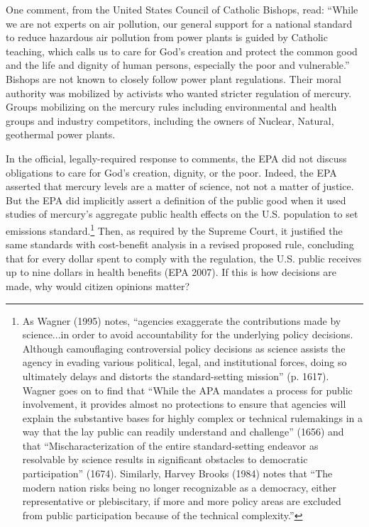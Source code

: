 One comment, from the United States Council of Catholic Bishops, read: ``While we are not experts on air pollution, our general support for a national standard to reduce hazardous air pollution from power plants is guided by Catholic teaching, which calls us to care for God’s creation and protect the common good and the life and dignity of human persons, especially the poor and vulnerable.'' Bishops are not known to closely follow power plant regulations. Their moral authority was mobilized by activists who wanted stricter regulation of mercury. Groups mobilizing on the mercury rules including environmental and health groups and industry competitors, including the owners of Nuclear, Natural, geothermal power plants. 

In the official, legally-required response to comments, the EPA did not discuss obligations to care for God's creation, dignity, or the poor. Indeed, the EPA asserted that mercury levels are a matter of science, not not a matter of justice. But the EPA did implicitly assert a definition of the public good when it used studies of mercury's aggregate public health effects on the U.S. population to set emissions standard.\footnote{As Wagner (1995) %
notes, ``agencies exaggerate the contributions made by science...in order to avoid accountability for the underlying policy decisions. Although camouflaging controversial policy decisions as science assists the agency in evading various political, legal, and institutional forces, doing so ultimately delays and distorts the standard-setting mission'' (p. 1617). Wagner goes on to find that  ``While the APA mandates a process for public involvement, it provides almost no protections to ensure that agencies will explain the substantive bases for highly complex or technical rulemakings in a way that the lay public can readily understand and challenge'' (1656) and that ``Mischaracterization of the entire standard-setting endeavor as resolvable by science results in significant obstacles to democratic participation'' (1674). Similarly, Harvey Brooks (1984) %
notes that ``The modern nation risks being no longer recognizable as a democracy, either representative or plebiscitary, if more and more policy areas are excluded from public participation because of the technical complexity.''} 
Then, as required by the Supreme Court, it justified the same standards with cost-benefit analysis in a revised proposed rule, concluding that for every dollar spent to comply with the regulation, the U.S. public receives up to nine dollars in health benefits (EPA 2007). If this is how decisions are made, %
why would citizen opinions matter? 

